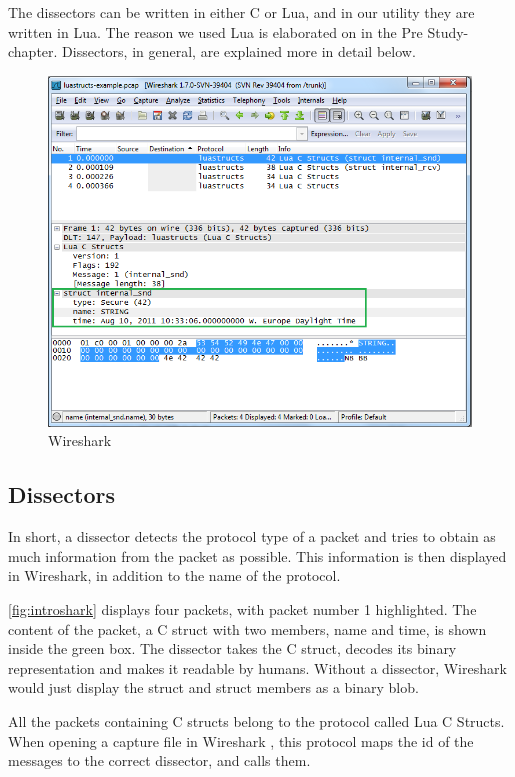 The dissectors can be written in either C or Lua, and in our utility they are written in Lua.
The reason we used Lua is elaborated on in the Pre Study-chapter.
Dissectors, in general, are explained more in detail below.

\begin{figure}[ht]
	\includegraphics[width=\textwidth]{./img/wireshark_example.png}
	\caption{Wireshark\label{fig:introshark}}
\end{figure}

\subsection*{Dissectors}
In short, a dissector detects the protocol type of a packet and tries to obtain as much information
from the packet as possible. This information is then displayed in Wireshark, in addition to the name of the protocol.

\autoref{fig:introshark} displays four packets, with packet number 1 highlighted.
The content of the packet, a C struct with two members, name and time,  is shown inside the green box.
The dissector takes the C struct, decodes its binary representation and makes it readable by humans.
Without a dissector, Wireshark would just display the struct and struct members as a binary blob.

All the packets containing C structs belong to the protocol called Lua C Structs.
When opening a capture file in Wireshark , this protocol maps the id of the messages to the correct dissector,
and calls them.

